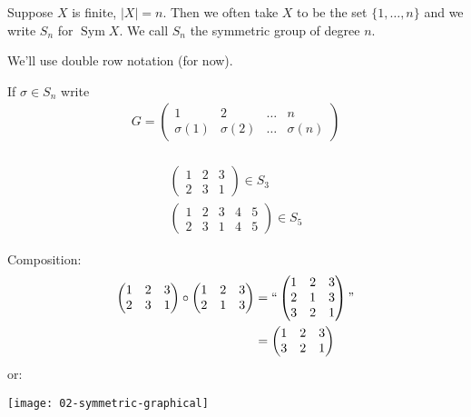 \begin{notation}
Suppose \(X\) is finite, \(|X| = n\).
Then we often take \(X\) to be the set \(\{ 1, \ldots, n \}\) and we write \(S_n\) for \(\operatorname{Sym} X\).
We call \(S_n\) the symmetric group of degree \(n\).
\end{notation}

\begin{notation}
We'll use double row notation (for now).

If \(\sigma \in S_n\) write
\begin{align*}
  G = \begin{pmatrix}
  1 & 2 & \ldots & n \\
  \sigma(1) & \sigma(2) & \ldots & \sigma(n)
  \end{pmatrix} \\
\end{align*}
\end{notation} 

\begin{example}
  \begin{align*}
    \begin{pmatrix}
    1 & 2 & 3 \\
    2 & 3 & 1
    \end{pmatrix} \in S_3 \\
    \begin{pmatrix}
    1 & 2 & 3 & 4 & 5 \\
    2 & 3 & 1 & 4 & 5
    \end{pmatrix} \in S_5
\end{align*}
\end{example} 

\begin{example}
  Composition:
\begin{align*}
    \begin{pmatrix}
    1 & 2 & 3 \\
    2 & 3 & 1
    \end{pmatrix} \circ
    \begin{pmatrix}
    1 & 2 & 3 \\
    2 & 1 & 3
    \end{pmatrix}
    &= ``\begin{pmatrix}
    1 & 2 & 3 \\
    2 & 1 & 3 \\
    3 & 2 & 1
    \end{pmatrix}" \\
    &= \begin{pmatrix}
        1 & 2 & 3 \\
        3 & 2 & 1
    \end{pmatrix}
\end{align*}
or:

{\centering \texttt{[image: 02-symmetric-graphical]}}
\end{example} 

